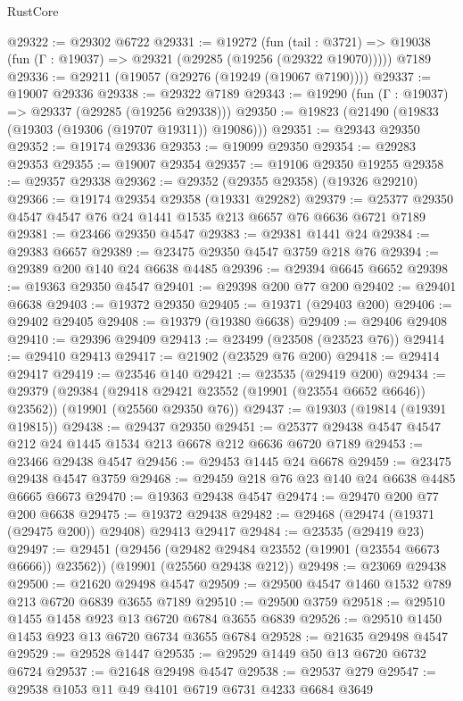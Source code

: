 \begin{lexlean}{RustCore}
\begin{coremodule}
@29322 := @29302 @6722
@29331 := @19272
    (fun (tail : @3721) => @19038 (fun (Γ : @19037) => @29321 (@29285 (@19256 (@29322 @19070)))))
    @7189
@29336 := @29211 (@19057 (@29276 (@19249 (@19067 @7190))))
@29337 := @19007 @29336
@29338 := @29322 @7189
@29343 := @19290 (fun (Γ : @19037) => @29337 (@29285 (@19256 @29338)))
@29350 := @19823 (@21490 (@19833 (@19303 (@19306 (@19707 @19311)) @19086)))
@29351 := @29343 @29350
@29352 := @19174 @29336
@29353 := @19099 @29350
@29354 := @29283 @29353
@29355 := @19007 @29354
@29357 := @19106 @29350 @19255
@29358 := @29357 @29338
@29362 := @29352 (@29355 @29358) (@19326 @29210)
@29366 := @19174 @29354 @29358 (@19331 @29282)
@29379 := @25377 @29350 @4547 @4547 @76 @24 @1441 @1535 @213 @6657 @76 @6636 @6721 @7189
@29381 := @23466 @29350 @4547
@29383 := @29381 @1441 @24
@29384 := @29383 @6657
@29389 := @23475 @29350 @4547 @3759 @218 @76
@29394 := @29389 @200 @140 @24 @6638 @4485
@29396 := @29394 @6645 @6652
@29398 := @19363 @29350 @4547
@29401 := @29398 @200 @77 @200
@29402 := @29401 @6638
@29403 := @19372 @29350
@29405 := @19371 (@29403 @200)
@29406 := @29402 @29405
@29408 := @19379 (@19380 @6638)
@29409 := @29406 @29408
@29410 := @29396 @29409
@29413 := @23499 (@23508 (@23523 @76))
@29414 := @29410 @29413
@29417 := @21902 (@23529 @76 @200)
@29418 := @29414 @29417
@29419 := @23546 @140
@29421 := @23535 (@29419 @200)
@29434 := @29379
    (@29384 (@29418 @29421 @23552 (@19901 (@23554 @6652 @6646)) @23562))
    (@19901 (@25560 @29350 @76))
@29437 := @19303 (@19814 (@19391 @19815))
@29438 := @29437 @29350
@29451 := @25377 @29438 @4547 @4547 @212 @24 @1445 @1534 @213 @6678 @212 @6636 @6720 @7189
@29453 := @23466 @29438 @4547
@29456 := @29453 @1445 @24 @6678
@29459 := @23475 @29438 @4547 @3759
@29468 := @29459 @218 @76 @23 @140 @24 @6638 @4485 @6665 @6673
@29470 := @19363 @29438 @4547
@29474 := @29470 @200 @77 @200 @6638
@29475 := @19372 @29438
@29482 := @29468 (@29474 (@19371 (@29475 @200)) @29408) @29413 @29417
@29484 := @23535 (@29419 @23)
@29497 := @29451
    (@29456 (@29482 @29484 @23552 (@19901 (@23554 @6673 @6666)) @23562))
    (@19901 (@25560 @29438 @212))
@29498 := @23069 @29438
@29500 := @21620 @29498 @4547
@29509 := @29500 @4547 @1460 @1532 @789 @213 @6720 @6839 @3655 @7189
@29510 := @29500 @3759
@29518 := @29510 @1455 @1458 @923 @13 @6720 @6784 @3655 @6839
@29526 := @29510 @1450 @1453 @923 @13 @6720 @6734 @3655 @6784
@29528 := @21635 @29498 @4547
@29529 := @29528 @1447
@29535 := @29529 @1449 @50 @13 @6720 @6732 @6724
@29537 := @21648 @29498 @4547
@29538 := @29537 @279
@29547 := @29538 @1053 @11 @49 @4101 @6719 @6731 @4233 @6684 @3649

\end{coremodule}
\end{lexlean}

